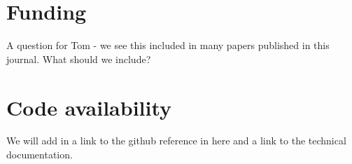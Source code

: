 \documentclass[unnumsec,webpdf,contemporary,large]{oup-authoring-template}%
\theoremstyle{thmstyleone}%
\theoremstyle{thmstyletwo}%
\theoremstyle{thmstylethree}%
\begin{document}

\section{Funding}

A question for Tom - we see this included in many papers published in this journal. What should we include?








\section{Code availability}

We will add in a link to the github reference in here and a link to the technical documentation. 






\end{document}
